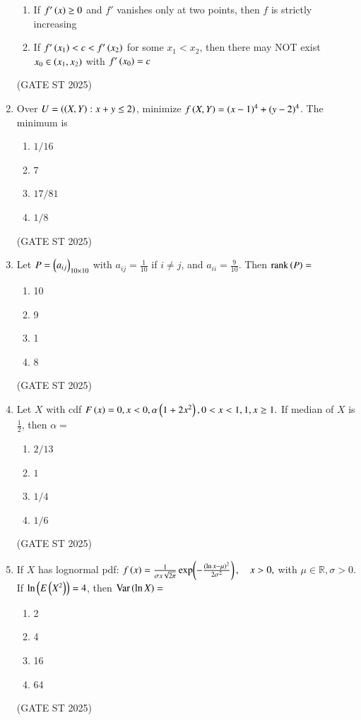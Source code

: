 \documentclass[journal,12pt,onecolumn]{IEEEtran}
\theoremstyle{remark}
\begin{document}
\begin{enumerate}
\begin{enumerate}
\item If $f'\left(x\right)\geq 0$ and $f'$ vanishes only at two points, then $f$ is strictly increasing
\item If $f'\left(x_1\right)<c<f'\left(x_2\right)$ for some $x_1<x_2$, then there may NOT exist $x_0\in\left(x_1,x_2\right)$ with $f'\left(x_0\right)=c$
\end{enumerate}
\hfill{(GATE ST 2025)}
\item Over $U=\left(\left(X,Y\right): x+y\leq 2\right)$, minimize $f\left(X,Y\right)=(x-1)^4+(y-2)^4$. The minimum is
\begin{enumerate}
\item $1/16$
\item $7$
\item $17/81$
\item $1/8$
\end{enumerate}
\hfill{(GATE ST 2025)}
\item Let $P=\left(a_{ij}\right)_{10\times 10}$ with 
$a_{ij}=\tfrac{1}{10}$ if $i\neq j$, and $a_{ii}=\tfrac{9}{10}$. Then $\mathrm{rank}\left(P\right)=$
\begin{enumerate}
\item 10 \item 9 \item 1 \item 8
\end{enumerate}
\hfill{(GATE ST 2025)}
\item Let $X$ with cdf
$
F\left(x\right)=
0,  x<0, \\
\alpha\left(1+2x^2\right),  0<x<1, \\
1,  x\geq 1.
$
If median of $X$ is $\tfrac{1}{2}$, then $\alpha=$
\begin{enumerate}
\item $2/13$ \item $1$ \item $1/4$ \item $1/6$
\end{enumerate}
\hfill{(GATE ST 2025)}
\item If $X$ has lognormal pdf:
$
f\left(x\right) = \frac{1}{\sigma x \sqrt{2\pi}} \exp\!\left(-\frac{(\ln x -\mu)^2}{2\sigma^2}\right), \quad x>0,
$
with $\mu\in\mathbb{R}, \sigma>0$. If $\ln \left(E\left(X^2\right)\right)=4$, then $\mathrm{Var}\left(\ln X\right)=$
\begin{enumerate}
\item 2 \item 4 \item 16 \item 64
\end{enumerate}
\hfill{(GATE ST 2025)}


\end{enumerate}
\end{document}
